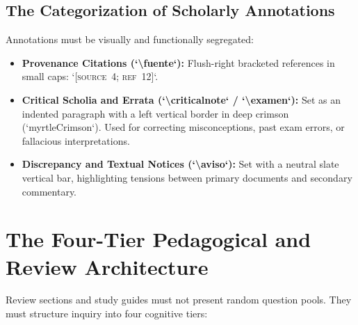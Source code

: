\documentclass[11pt,letterpaper]{article}
\begin{document}
\subsection{The Categorization of Scholarly Annotations}
Annotations must be visually and functionally segregated:
\begin{itemize}
  \item \textbf{Provenance Citations (`\textbackslash fuente`):} Flush-right bracketed references in small caps: `[\textsc{source}~4; \textsc{ref}~12]`.
  \item \textbf{Critical Scholia and Errata (`\textbackslash criticalnote` / `\textbackslash examen`):} Set as an indented paragraph with a left vertical border in deep crimson (`myrtleCrimson`). Used for correcting misconceptions, past exam errors, or fallacious interpretations.
  \item \textbf{Discrepancy and Textual Notices (`\textbackslash aviso`):} Set with a neutral slate vertical bar, highlighting tensions between primary documents and secondary commentary.
\end{itemize}

\section{The Four-Tier Pedagogical and Review Architecture}

Review sections and study guides must not present random question pools. They must structure inquiry into four cognitive tiers:
\end{document}
